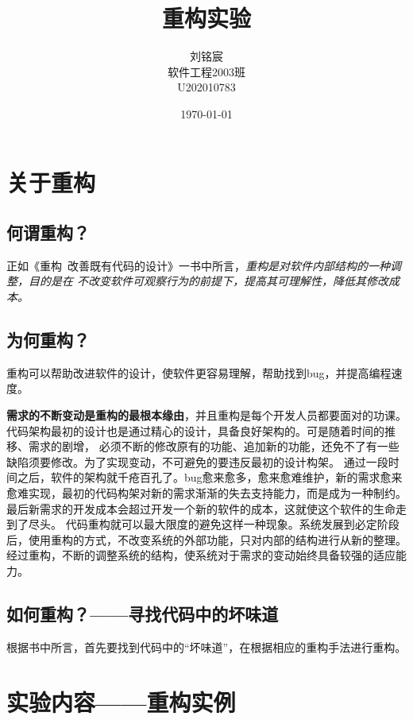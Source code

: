 \documentclass[a4paper]{article}
\title{重构实验}
\author{刘铭宸\\软件工程2003班\\U202010783}
\date{\today}
\begin{document}
\begin{titlepage}
\maketitle
\end{titlepage}

\tableofcontents

\newpage
\section{关于重构}
\subsection{何谓重构？}
正如《重构~改善既有代码的设计》一书中所言，\emph{重构是对软件内部结构的一种调整，目的是在
不改变软件可观察行为的前提下，提高其可理解性，降低其修改成本。}
\subsection{为何重构？}
重构可以帮助改进软件的设计，使软件更容易理解，帮助找到bug，并提高编程速度。

\textbf{需求的不断变动是重构的最根本缘由}，并且重构是每个开发人员都要面对的功课。 
代码架构最初的设计也是通过精心的设计，具备良好架构的。可是随着时间的推移、需求的剧增，
必须不断的修改原有的功能、追加新的功能，还免不了有一些缺陷须要修改。为了实现变动，不可避免的要违反最初的设计构架。
通过一段时间之后，软件的架构就千疮百孔了。bug愈来愈多，愈来愈难维护，新的需求愈来愈难实现，最初的代码构架对新的需求渐渐的失去支持能力，而是成为一种制约。
最后新需求的开发成本会超过开发一个新的软件的成本，这就使这个软件的生命走到了尽头。 
代码重构就可以最大限度的避免这样一种现象。系统发展到必定阶段后，使用重构的方式，不改变系统的外部功能，只对内部的结构进行从新的整理。经过重构，不断的调整系统的结构，使系统对于需求的变动始终具备较强的适应能力。

\subsection{如何重构？——寻找代码中的坏味道}
根据书中所言，首先要找到代码中的“坏味道”，在根据相应的重构手法进行重构。
\newpage

\section{实验内容——重构实例}
\end{document}
